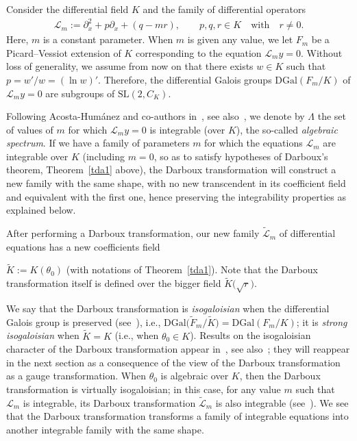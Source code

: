 \documentclass[10pt,a4paper]{amsart}
\numberwithin{equation}{section}
\begin{document}
Consider the differential field $K$ and the family of differential operators
\begin{gather}\label{eqdarb}
 {\mathcal{L}}_m:=\partial_x^2 + p \partial_x +(q -mr), \qquad p,q,r\in K\quad \textrm{with}\quad
 r\neq 0.
\end{gather}
Here, $m$ is a constant parameter.
When $m$ is given any value, we let $F_m$ be a Picard--Vessiot extension of $K$ corresponding to the equation ${\mathcal{L}}_m y=0$.
Without loss of generality,
 we assume from now on that there exists $w\in K$ such that $p=w'/w = (\ln w)'$.
 Therefore, the differential Galois groups $\mathrm{DGal}(F_m/K)$ of ${\mathcal{L}}_my=0$ are subgroups of $\mathrm{SL}(2,C_K)$.

Following Acosta-Hum\'anez and co-authors in~\cite{AP1}, see also~\cite{AP2, ac2}, we denote by $\Lambda$ the set of values of $m$ for which ${\mathcal{L}}_m y=0$ is integrable (over $K$), the so-called \emph{algebraic spectrum}.
 If we have a family of parameters $m$
 for which the equations ${\mathcal{L}}_m$ are integrable over $K$
(including $m=0$, so as to satisfy hypotheses of Darboux's theorem, Theorem~\ref{tda1} above), the Darboux transformation will construct a new family with the same shape, with no new transcendent in its coefficient field and equivalent with the first one, hence
preserving the integrability properties as explained below.

After performing a Darboux transformation, our new family $\widetilde{\mathcal{L}}_m$ of differential equations has a new
coefficients field

$\widetilde{K}:= K(\theta_0)$ (with notations of Theorem~\ref{tda1}).
Note that the Darboux transformation itself is defined over the bigger field $\widetilde{K}\big(\sqrt{r}\big)$.

We say that
the Darboux transformation is
\emph{isogaloisian} when the differential Galois group is preserved (see~\cite{AP2,ac2,AP1}), i.e.,
	$\mathrm{DGal}\big(\widetilde{F}_m/{\widetilde K}\big) =\mathrm{DGal}(F_m/K)$;
 it is \emph{strong isogaloisian} when $\widetilde K=K$
 (i.e., when $\theta_0\in K$).
 Results on the isogaloisian character of the Darboux transformation appear in~\cite{AP1}, see also~\cite{AP2, ac2}; they will reappear in the next section as a consequence of the view of the Darboux transformation as a gauge transformation. When $\theta_0$ is algebraic over $K$, then the Darboux transformation is virtually isogaloisian; in this case, for any value $m$ such that ${\mathcal{L}}_m$ is integrable, its Darboux transformation $\widetilde{\mathcal{L}}_m$ is also integrable (see~\cite{AP1}).
We see that the Darboux transformation transforms a family of integrable equations into another integrable family with the same shape.
\end{document}
